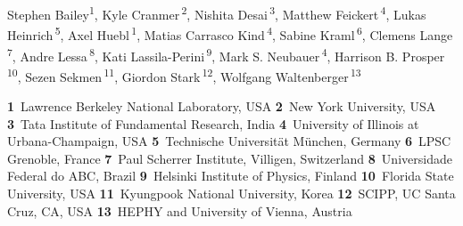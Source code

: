 \documentclass[11pt]{article}
\begin{document}
\pubblock

\snowmass{}


\medskip


\begin{center}
Stephen Bailey\textsuperscript{1},
Kyle Cranmer\,\textsuperscript{2},
Nishita Desai\,\textsuperscript{3},
Matthew Feickert\,\textsuperscript{4},
Lukas Heinrich\,\textsuperscript{5},
Axel Huebl\,\textsuperscript{1},
Matias Carrasco Kind\,\textsuperscript{4},
Sabine Kraml\,\textsuperscript{6},
Clemens Lange\,\textsuperscript{7},
Andre Lessa\,\textsuperscript{8},
Kati Lassila-Perini\,\textsuperscript{9},
Mark S. Neubauer\,\textsuperscript{4},
Harrison B. Prosper\,\textsuperscript{10},
Sezen Sekmen\,\textsuperscript{11},
Giordon Stark\,\textsuperscript{12},
Wolfgang Waltenberger\,\textsuperscript{13}
\end{center}

\begin{center}
\textbf{1}~Lawrence Berkeley National Laboratory, USA
\textbf{2}~New York University, USA
\textbf{3}~Tata Institute of Fundamental Research, India
\textbf{4}~University of Illinois at Urbana-Champaign, USA
\textbf{5}~Technische Universität München, Germany
\textbf{6}~LPSC Grenoble, France
\textbf{7}~Paul Scherrer Institute, Villigen, Switzerland
\textbf{8}~Universidade Federal do ABC, Brazil
\textbf{9}~Helsinki Institute of Physics, Finland
\textbf{10}~Florida State University, USA
\textbf{11}~Kyungpook National University, Korea
\textbf{12}~SCIPP, UC Santa Cruz, CA, USA
\textbf{13}~HEPHY and University of Vienna, Austria
\end{center}
\end{document}
